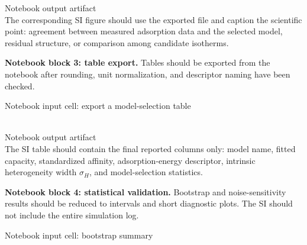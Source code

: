 \documentclass[journal=jacsat,manuscript=article]{achemso}
\begin{document}
\begin{greenbox}{Notebook output artifact}
\small
\noindent\texttt{}\\
The corresponding SI figure should use the exported file and caption the
scientific point: agreement between measured adsorption data and the selected
model, residual structure, or comparison among candidate isotherms.
\end{greenbox}

\noindent\textbf{Notebook block 3: table export.}
Tables should be exported from the notebook after rounding, unit normalization,
and descriptor naming have been checked.

\begin{bluebox}{Notebook input cell: export a model-selection table}
\small
\noindent\texttt{}\\
\texttt{}\\
\texttt{}
\end{bluebox}

\begin{greenbox}{Notebook output artifact}
\small
\noindent\texttt{}\\
The SI table should contain the final reported columns only: model name, fitted
capacity, standardized affinity, adsorption-energy descriptor, intrinsic
heterogeneity width \(\sigma_H\), and model-selection statistics.
\end{greenbox}

\noindent\textbf{Notebook block 4: statistical validation.}
Bootstrap and noise-sensitivity results should be reduced to intervals and
short diagnostic plots. The SI should not include the entire simulation log.

\begin{bluebox}{Notebook input cell: bootstrap summary}
\small
\noindent\texttt{}\\
\texttt{}\\
\texttt{}
\end{bluebox}
\end{document}
